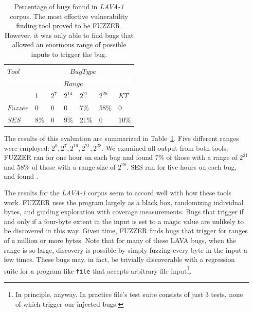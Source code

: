 \begin{table}[h]
\centering
\begin{tabular}{l|l|l|l|l|l|l} 
$Tool$   &                     \multicolumn{6}{|c}{$Bug Type$}                           \\  \hline  
         &                     \multicolumn{5}{|c|}{$Range$}                   &     \\   
         &    1       & $2^7$       & $2^{14}$     & $2^{21}$   & $2^{28}$     & $KT$   \\  \hline 
$Fuzzer$ &    0       & 0           & 0            & 7\%        & 58\%         & 0         \\
$SES$    &    8\%     & 0           & 9\%          & 21\%       & 0            & 10\%         \\
\end{tabular}
\caption{Percentage of bugs found in \emph{LAVA-1} corpus. %
The most effective vulnerability finding tool proved to be FUZZER.  
However, it was only able to find bugs that allowed an enormous range of possible inputs to trigger the bug.}
\label{table:eval1-file}
\end{table}

The results of this evaluation are summarized in Table~\ref{table:eval1-file}.
Five different ranges were employed: $2^0, 2^7, 2^{16}, 2^{21}, 2^{28}$. 
We examined all output from both tools.
FUZZER ran for one hour on each bug and found 7\% of those with a range of $2^{21}$ and 58\% of those with a range size of $2^{28}$.
SES ran for five hours on each bug, and found .

The results for the \emph{LAVA-1} corpus seem to accord well with how these tools work.
FUZZER uses the program largely as a black box, randomizing individual bytes, and guiding exploration with coverage measurements.
Bugs that trigger if and only if a four-byte extent in the input is set to a magic value are unlikely to be discovered in this way.
Given time, FUZZER finds bugs that trigger for ranges of a million or more bytes. 
Note that for many of these LAVA bugs, when the range is so large, discovery is possible by simply fuzzing every byte in the input a few times.  
These bugs may, in fact, be trivially discoverable with a regression suite for a program like \verb+file+ that accepts arbitrary file input\footnote{In principle, anyway. In practice file's test suite consists of just 3 tests, none of which trigger our injected bugs.}.

